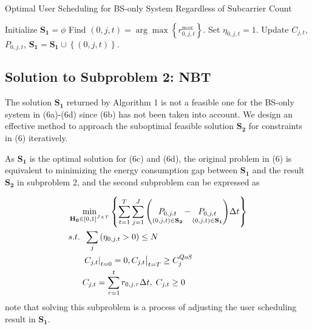\documentclass{ieeeaccess}
\begin{document}
\begin{algorithm}[h]
\caption{Optimal User Scheduling for BS-only System Regardless of Subcarrier Count}
\label{alg:1}
\begin{algorithmic}[1]
\STATE Initialize ${{\mathbf{S}}_{\mathbf{1}}}=\phi$
    \STATE Find $\left( {0,j,t} \right) = \arg \max \left\{ {r_{0,j,t}^{\max }} \right\}$.
    \STATE Set ${\eta _{0,j,t}} = 1$.
    \STATE Update ${C_{j,t}}$, ${P_{0,j,t}}$, ${{\mathbf{S}}_{\mathbf{1}}}={{\mathbf{S}}_{\mathbf{1}}} \cup \left\{ {\left( {0,j,t} \right)} \right\}$.
  \ENDWHILE
\ENDFOR
\end{algorithmic}
\end{algorithm}



\subsection{Solution to \textbf{Subproblem 2: NBT}}

The solution ${{\mathbf{S}}_{\mathbf{1}}}$ returned by Algorithm 1 is not a feasible one for the BS-only system in (6a)-(6d) since (6b) has not been taken into account. We design an effective method to approach the suboptimal feasible solution ${{\mathbf{S}}_{\mathbf{2}}}$ for constraints in (6) iteratively.

As ${{\mathbf{S}}_{\mathbf{1}}}$ is the optimal solution for (6c) and (6d), the original problem in (6) is equivalent to minimizing the energy consumption gap between ${{\mathbf{S}}_{\mathbf{1}}}$ and the result ${{\mathbf{S}}_{\mathbf{2}}}$ in subproblem 2, and the second subproblem can be expressed as

\begin{subequations}
\begin{align}
& \mathop {\min }\limits_{{{\mathbf{{\rm H}}}_{\mathbf{0}}} \in {{\left[ {0,1} \right]}^{J \times T}}} \left\{ {\sum\limits_{t = 1}^T {\sum\limits_{j = 1}^J {\left( {\mathop {{P_{0,j,t}}}\limits_{\left( {0,j,t} \right) \in {{\mathbf{S}}_{\mathbf{2}}}}  - \mathop {{P_{0,j,t}}}\limits_{\left( {0,j,t} \right) \in {{\mathbf{S}}_{\mathbf{1}}}} } \right)} \Delta t} } \right\} \\
& {s.t.} \;\; \sum\limits_j  {\left( {{\eta _{0,j,t}} > 0} \right)}  \le N \\
& \;\;\;\;\;\; {\left. {{{\left. {{C_{j,t}}} \right|}_{t = 0}} = 0, {C_{j,t}}} \right|_{t = T}} \ge C_j^{QoS} \\
& \;\;\;\;\;\; {C_{j,t}} = \sum\limits_{\tau  = 1}^t {{r_{0,j,\tau }}\Delta t} ,\; {C_{j,t}} \ge 0
\end{align}
\end{subequations}
note that solving this subproblem is a process of adjusting the user scheduling result in ${{\mathbf{S}}_{\mathbf{1}}}$.
\end{document}
